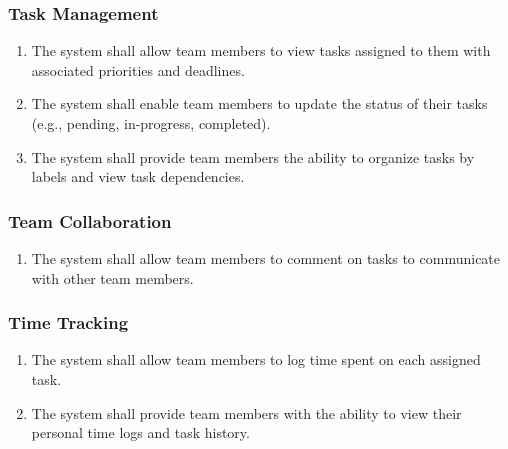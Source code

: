 \documentclass[]{article}
\begin{document}
            \subsubsection{Task Management}
            \begin{enumerate}[label=\scriptsize\textbf{\textcolor{gray}{FR-TM-\arabic{tmCounter}}}, leftmargin=*, itemsep=-4px]
                \item The system shall allow team members to view tasks assigned to them with associated priorities and deadlines.
                \item The system shall enable team members to update the status of their tasks (e.g., pending, in-progress, completed).
                \item The system shall provide team members the ability to organize tasks by labels and view task dependencies.
            \end{enumerate}

            \subsubsection{Team Collaboration}
            \begin{enumerate}[label=\scriptsize\textbf{\textcolor{gray}{FR-TM-\arabic{tmCounter}}}, leftmargin=*, itemsep=-4px]
                \item The system shall allow team members to comment on tasks to communicate with other team members.
            \end{enumerate}

            \subsubsection{Time Tracking}
            \begin{enumerate}[label=\scriptsize\textbf{\textcolor{gray}{FR-TM-\arabic{tmCounter}}}, leftmargin=*, itemsep=-4px]
                \item The system shall allow team members to log time spent on each assigned task.
                \item The system shall provide team members with the ability to view their personal time logs and task history.
            \end{enumerate}
\end{document}
